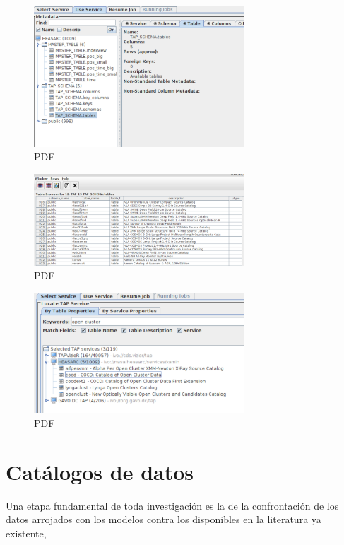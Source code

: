 \begin{figure}
	\centering
	\includegraphics[width=0.7\textwidth]{img/tesis/tap_schema.pdf}
	\caption{PDF}
	\label{fig:tap_schema}
\end{figure}

\begin{figure}
	\centering
	\includegraphics[width=0.7\textwidth]{img/tesis/tap_schema_detail.pdf}
	\caption{PDF}
	\label{fig:tap_schema_detail}
\end{figure}

\begin{figure}
	\centering
	\includegraphics[width=0.7\textwidth]{img/tesis/tap_service.pdf}
	\caption{PDF}
	\label{fig:tap_service}
\end{figure}






\section{Catálogos de datos}
Una etapa fundamental de toda investigación es la de la confrontación de los datos arrojados con los modelos contra los disponibles en la literatura ya existente,

